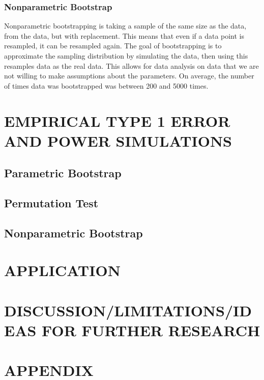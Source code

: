 \documentclass[12pt, letterpaper]{article}
\begin{document}
\subsubsection{Nonparametric Bootstrap}
Nonparametric bootstrapping is taking a sample of the same size as the data, from the data, but with replacement. This means that even if a data point is resampled, it can be resampled again. The goal of bootstrapping is to approximate the sampling distribution by simulating the data, then using this resamples data as the real data. This allows for data analysis on data that we are not willing to make assumptions about the parameters. On average, the number of times data was bootstrapped was between 200 and 5000 times. 

\section{EMPIRICAL TYPE 1 ERROR AND POWER SIMULATIONS}

\subsection{Parametric Bootstrap}
\subsection{Permutation Test}
\subsection{Nonparametric Bootstrap}


\section{APPLICATION}


\section{DISCUSSION/LIMITATIONS/IDEAS FOR FURTHER RESEARCH}


\section{APPENDIX}
\end{document}
